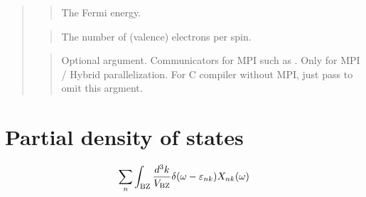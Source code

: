 \documentclass[letterpaper,10pt,pdftex,openany,english]{sphinxmanual}
\begin{document}
\begin{quote}
\begin{quote}
\sphinxAtStartPar
The Fermi energy.
\end{quote}

\begin{sphinxVerbatim}[commandchars=\\\{\}]
\end{sphinxVerbatim}
\begin{quote}

\sphinxAtStartPar
The number of (valence) electrons per spin.
\end{quote}

\begin{sphinxVerbatim}[commandchars=\\\{\}]
\end{sphinxVerbatim}
\begin{quote}

\sphinxAtStartPar
Optional argument. Communicators for MPI such as .
Only for MPI / Hybrid parallelization.
For C compiler without MPI, just pass  to omit this argment.
\end{quote}
\end{quote}


\section{Partial density of states}
\label{\detokenize{routine:partial-density-of-states}}\begin{equation*}
\begin{split}\begin{align}
\sum_{n}
\int_{\rm BZ} \frac{d^3 k}{V_{\rm BZ}}
\delta(\omega - \varepsilon_{n k})
X_{n k}(\omega)
\end{align}\end{split}
\end{equation*}
\begin{sphinxVerbatim}[commandchars=\\\{\}]
\end{sphinxVerbatim}
\end{document}
